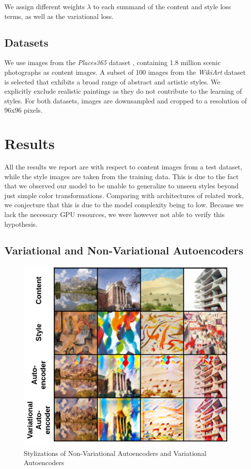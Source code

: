 \documentclass[10pt,twocolumn,letterpaper]{article}
\begin{document}
We assign different weights $\lambda$ to each summand of the content and style loss terms, as well as the variational loss.

\subsection{Datasets}

We use images from the \textit{Places365} dataset \cite{places365}, containing 1.8 million scenic photographs as content images. A subset of 100 images from the \textit{WikiArt} dataset is selected that exhibits a broad range of abstract and artistic styles. We explicitly exclude realistic paintings as they do not contribute to the learning of styles. For both datasets, images are downsampled and cropped to a resolution of 96x96 pixels.

\section{Results}

All the results we report are with respect to content images from a test dataset, while the style images are taken from the training data. This is due to the fact that we observed our model to be unable to generalize to unseen styles beyond just simple color transformations. Comparing with architectures of related work, we conjecture that this is due to the model complexity being to low. Because we lack the necessary GPU resources, we were however not able to verify this hypothesis.

\subsection{Variational and Non-Variational Autoencoders}
	
\begin{figure}
\centering
\includegraphics[width=0.9\linewidth]{ae_vs_vae.png}
\caption{Stylizations of Non-Variational Autoencoders and Variational Autoencoders}
\label{fig:ae_vae}
\end{figure}
\end{document}
